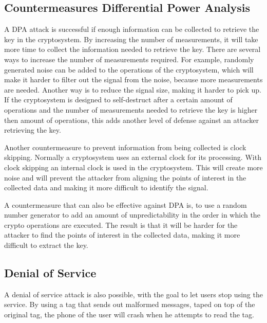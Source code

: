 \subsection{Countermeasures Differential Power Analysis}
A DPA attack is successful if enough information can be collected to retrieve the key in the cryptosystem.
By increasing the number of measurements, it will take more time to collect the information needed to retrieve the key. 
There are several ways to increase the number of measurements required.
For example, randomly generated noise can be added to the operations of the cryptosystem, which will make it harder to filter out the signal from the noise, because more measurements are needed.
Another way is to reduce the signal size, making it harder to pick up. 
If the cryptosystem is designed to self-destruct after a certain amount of operations and the number of measurements needed to retrieve the key is higher then amount of operations, this adds another level of defense against an attacker retrieving the key.

Another countermeasure to prevent information from being collected is clock skipping.
Normally a cryptosystem uses an external clock for its processing.
With clock skipping an internal clock is used in the cryptosystem.
This will create more noise and will prevent the attacker from aligning the points of interest in the collected data and making it more difficult to identify the signal. 

A countermeasure that can also be effective against DPA is, to use a random number generator to add an amount of unpredictability in the order in which the crypto operations are executed.
The result is that it will be harder for the attacker to find the points of interest in the collected data, making it more difficult to extract the key. 


\subsection{Denial of Service}
A denial of service attack is also possible, with the goal to let users stop using the service. By using a tag that sends out malformed messages, taped on top of the original tag, the phone of the user will crash when he attempts to read the tag.
